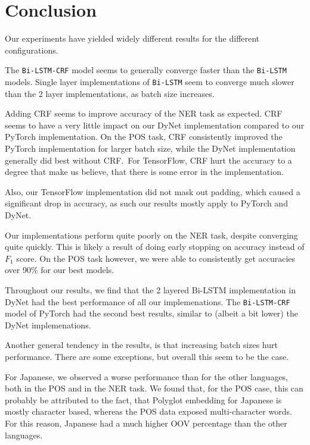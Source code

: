 

\section{Conclusion}

Our experiments have yielded widely different results for the different
configurations.

The \texttt{Bi-LSTM-CRF} model seems to generally converge faster than the
\texttt{Bi-LSTM} models. Single layer implementations of \texttt{Bi-LSTM}
seem to converge much slower than the 2 layer implementations, as batch size
increases.

Adding CRF seems to improve accuracy of the NER task as expected. CRF seems to
have a very little impact on our DyNet implementation compared to our PyTorch
implementation. On the POS task, CRF consistently improved the PyTorch
implementation for larger batch size, while the DyNet implementation generally
did best without CRF.\ For TensorFlow, CRF hurt the accuracy to a degree that
make us believe, that there is some error in the implementation.

Also, our TensorFlow implementation did not mask out padding, which caused a
significant drop in accuracy, as such our results mostly apply to PyTorch and
DyNet.

Our implementations perform quite poorly on the NER task, despite converging
quite quickly. This is likely a result of doing early stopping on accuracy
instead of $F_1$ score. On the POS task however, we were able to consistently
get accuracies over 90\% for our best models.

Throughout our results, we find that the 2 layered Bi-LSTM implementation in
DyNet had the best performance of all our implemenations. The
\texttt{Bi-LSTM-CRF} model of PyTorch had the second best results, similar to
(albeit a bit lower) the DyNet implemenations.

Another general tendency in the results, is that increasing batch sizes hurt
performance. There are some exceptions, but overall this seem to be the case.

For Japanese, we observed a worse performance than for the other languages, both
in the POS and in the NER task. We found that, for the POS case, this can
probably be attributed to the fact, that Polyglot embedding for Japanese is
mostly character based, whereas the POS data exposed multi-character words. For
this reason, Japanese had a much higher OOV percentage than the other languages.

